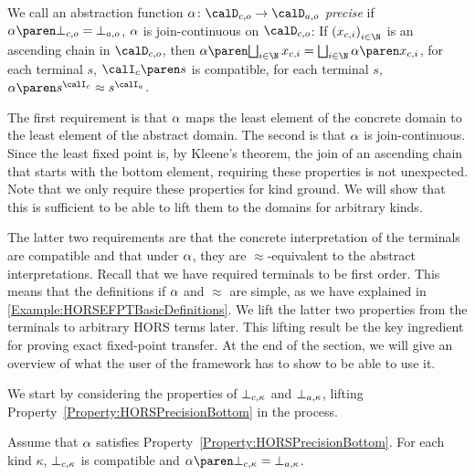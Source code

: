 \documentclass[../../diss.tex]{subfiles}
\begin{document}
\begin{definition}%
\label{Definition:HORSEFPTPrecise}%
    We call an abstraction function $\abs \colon \domainc{\ground} \to \domaina{\ground}$ \emph{precise} if
     $\abs{\botc{\ground}} = \bota{\ground}$,
     $\abs$ is join-continuous on $\domainc{\ground}$:
            If ${(\xci)}_{i \in \N}$ is an ascending chain in $\domainc{\ground}$, then $\abs{\bigsqcup_{i \in \N} \xci} = \bigsqcup_{i \in \N} \abs{\xci}$,
     for each terminal $s$, $\interpretationc{s}$ is compatible,
     for each terminal $s$, $\abs{s^{\interpretationc}} \approx s^{\interpretationa}$.
\end{definition}

The first requirement is that $\abs$ maps the least element of the concrete domain to the least element of the abstract domain.
The second is that $\abs$ is join-continuous.
Since the least fixed point is, by Kleene's theorem, the join of an ascending chain that starts with the bottom element, requiring these properties is not unexpected.
Note that we only require these properties for kind ground.
We will show that this is sufficient to be able to lift them to the domains for arbitrary kinds.

The latter two requirements are that the concrete interpretation of the terminals are compatible and that under $\abs$, they are $\approx$-equivalent to the abstract interpretations.
Recall that we have required terminals to be first order.
This means that the definitions if $\abs$ and $\approx$ are simple, as we have explained in \cref{Example:HORSEFPTBasicDefinitions}.
We lift the latter two properties from the terminals to arbitrary HORS terms later.
This lifting result be the key ingredient for proving exact fixed-point transfer.
At the end of the section, we will give an overview of what the user of the framework has to show to be able to use it.

We start by considering the properties of $\botc{\kappa}$ and $\bota{\kappa}$, lifting Property~\ref{Property:HORSPrecisionBottom} in the process.

\begin{lemma}%
\label{Lemma:HORSEFPTLiftBottom}%
    Assume that $\abs$ satisfies Property~\ref{Property:HORSPrecisionBottom}.
    For each kind $\kappa$, $\botc{\kappa}$ is compatible and $\abs{\botc{\kappa}} = \bota{\kappa}$.
\end{lemma}
\end{document}
